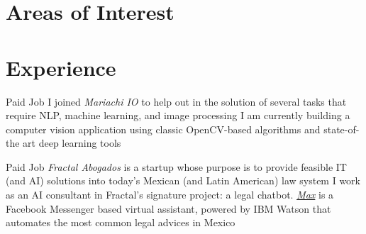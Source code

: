 \documentclass[11pt,a4paper,sans]{moderncv} %
\begin{document}
\section{Areas of Interest}


\section{Experience}

        {Paid Job}
        {I joined \emph{Mariachi IO} to help out in the solution of several tasks that require NLP, machine learning, and image processing}
        {I am currently building a computer vision application using classic OpenCV-based algorithms and state-of-the art deep learning tools}
        {}
        {}

        {Paid Job}
        {\emph{Fractal Abogados} is a startup whose purpose is to provide feasible IT (and AI) solutions into today's Mexican (and Latin American) law system}
        {I work as an AI consultant in Fractal's signature project: a legal chatbot. \href{https://m.me/fractal-abogados}{\emph{Max}} is a Facebook Messenger based virtual assistant, powered by IBM Watson that automates the most common legal advices in Mexico}
        {}
        {}
\end{document}
